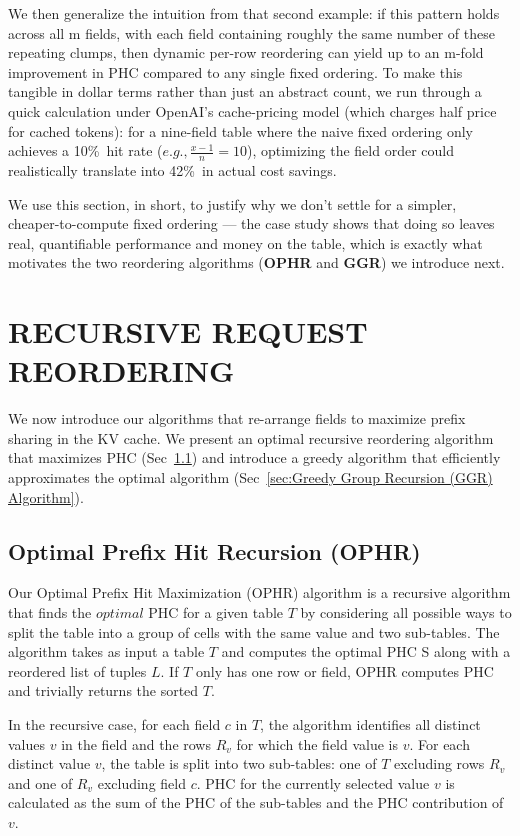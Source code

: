 \documentclass[manuscript,review]{acmart}
\begin{document}
We then generalize the intuition from that second example: if this pattern holds across all m fields, with each field containing roughly the same number of these repeating clumps, then dynamic per-row reordering can yield up to an m-fold improvement in PHC compared to any single fixed ordering. To make this tangible in dollar terms rather than just an abstract count, we run through a quick calculation under OpenAI's cache-pricing model (which charges half price for cached tokens): for a nine-field table where the naive fixed ordering only achieves a 10\%\ hit rate ($e.g., \frac{x-1}{n}=10$), optimizing the field order could realistically translate into 42\%\ in actual cost savings.

We use this section, in short, to justify why we don't settle for a simpler, cheaper-to-compute fixed ordering — the case study shows that doing so leaves real, quantifiable performance and money on the table, which is exactly what motivates the two reordering algorithms (\textbf{OPHR} and \textbf{GGR}) we introduce next.
\section{RECURSIVE REQUEST REORDERING}
\label{sec:recursive request reordering}
We now introduce our algorithms that re-arrange fields to
maximize prefix sharing in the KV cache. We present an
optimal recursive reordering algorithm that maximizes PHC
(Sec~\ref{sec:Optimal Prefix Hit Recursion (OPHR)}) and introduce a greedy algorithm that efficiently
approximates the optimal algorithm (Sec~\ref{sec:Greedy Group Recursion (GGR) Algorithm}).
\subsection{Optimal Prefix Hit Recursion (OPHR)}
\label{sec:Optimal Prefix Hit Recursion (OPHR)}
Our Optimal Prefix Hit Maximization (OPHR) algorithm is
a recursive algorithm that finds the $optimal$ PHC for a given
table $T$ by considering all possible ways to split the table
into a group of cells with the same value and two sub-tables.
The algorithm takes as input a table $T$ and computes the
optimal PHC S along with a reordered list of tuples $L$. If
$T$ only has one row or field, OPHR computes PHC and
trivially returns the sorted $T$.

In the recursive case, for each field $c$ in $T$, the algorithm
identifies all distinct values $v$ in the field and the rows $R_{v}$
for which the field value is $v$. For each distinct value $v$, the
table is split into two sub-tables: one of $T$ excluding rows
$R_{v}$ and one of $R_{v}$ excluding field $c$. PHC for the currently
selected value $v$ is calculated as the sum of the PHC of the
sub-tables and the PHC contribution of $v$.
\end{document}
